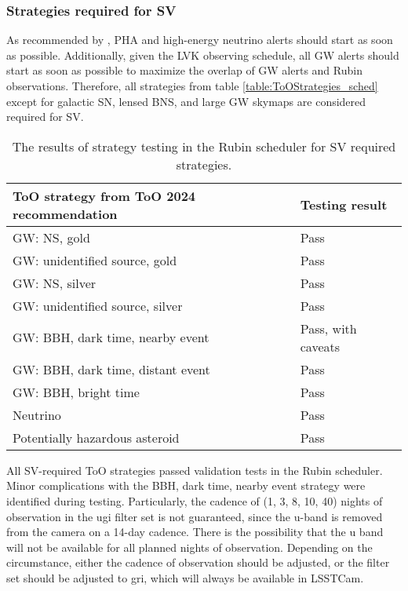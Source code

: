 \subsubsection{Strategies required for SV}\label{subsubsec:SVRequiredValidation}

As recommended by \cite{PSTN-056}, PHA and high-energy neutrino alerts should start as soon as possible. Additionally, given the LVK observing schedule, all GW alerts should start as soon as possible to maximize the overlap of GW alerts and Rubin observations. Therefore, all strategies from table \ref{table:ToOStrategies_sched} except for galactic SN, lensed BNS, and large GW skymaps are considered required for SV.

\begin{table}[]
\centering
\begin{tabular}{|l|l|}
\hline
ToO strategy from ToO 2024 recommendation & Testing result       \\ \hline
GW: NS, gold                              & Pass                 \\ \hline
GW: unidentified source, gold             & Pass                 \\ \hline
GW: NS, silver                            & Pass                 \\ \hline
GW: unidentified source, silver           & Pass                 \\ \hline
GW: BBH, dark time, nearby event                             & Pass, with caveats \\ \hline
GW: BBH, dark time, distant event                              & Pass \\ \hline
GW: BBH, bright time                                & Pass \\ \hline
Neutrino                                  & Pass                 \\ \hline
Potentially hazardous asteroid                      & Pass                 \\ \hline
\end{tabular}
\caption{The results of strategy testing in the Rubin scheduler for SV required strategies.}
\label{tab:SVRequiredStrategy results}
\end{table}

All SV-required ToO strategies passed validation tests in the Rubin scheduler. Minor complications with the BBH, dark time, nearby event strategy were identified during testing. Particularly, the cadence of (1, 3, 8, 10, 40) nights of observation in the ugi filter set is not guaranteed, since the u-band is removed from the camera on a 14-day cadence. There is the possibility that the u band will not be available for all planned nights of observation. Depending on the circumstance, either the cadence of observation should be adjusted, or the filter set should be adjusted to gri, which will always be available in LSSTCam.

